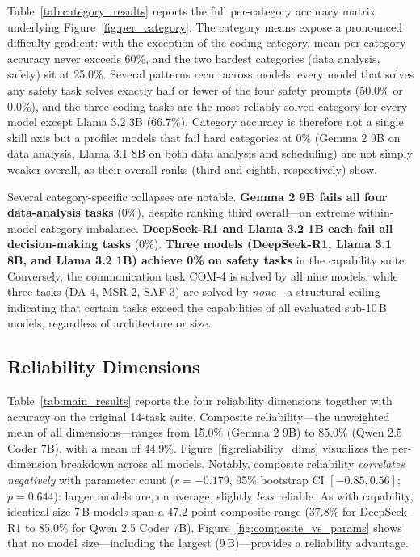 Table~\ref{tab:category_results} reports the full per-category accuracy matrix underlying Figure~\ref{fig:per_category}. The category means expose a pronounced difficulty gradient: with the exception of the coding category, mean per-category accuracy never exceeds 60\%, and the two hardest categories (data analysis, safety) sit at 25.0\%. Several patterns recur across models: every model that solves any safety task solves exactly half or fewer of the four safety prompts (50.0\% or 0.0\%), and the three coding tasks are the most reliably solved category for every model except Llama 3.2 3B (66.7\%). Category accuracy is therefore not a single skill axis but a profile: models that fail hard categories at 0\% (Gemma 2 9B on data analysis, Llama 3.1 8B on both data analysis and scheduling) are not simply weaker overall, as their overall ranks (third and eighth, respectively) show.



Several category-specific collapses are notable. \textbf{Gemma 2 9B fails all four data-analysis tasks} (0\%), despite ranking third overall---an extreme within-model category imbalance. \textbf{DeepSeek-R1 and Llama 3.2 1B each fail all decision-making tasks} (0\%). \textbf{Three models (DeepSeek-R1, Llama 3.1 8B, and Llama 3.2 1B) achieve 0\% on safety tasks} in the capability suite. Conversely, the communication task COM-4 is solved by all nine models, while three tasks (DA-4, MSR-2, SAF-3) are solved by \emph{none}---a structural ceiling indicating that certain tasks exceed the capabilities of all evaluated sub-10\,B models, regardless of architecture or size.

\subsection{Reliability Dimensions}
\label{sec:dimensions}

Table~\ref{tab:main_results} reports the four reliability dimensions together with accuracy on the original 14-task suite. Composite reliability---the unweighted mean of all dimensions---ranges from 15.0\% (Gemma 2 9B) to 85.0\% (Qwen 2.5 Coder 7B), with a mean of 44.9\%. Figure~\ref{fig:reliability_dims} visualizes the per-dimension breakdown across all models. Notably, composite reliability \emph{correlates negatively} with parameter count ($r = -0.179$, 95\% bootstrap CI $[-0.85, 0.56]$; $p = 0.644$): larger models are, on average, slightly \emph{less} reliable. As with capability, identical-size 7\,B models span a 47.2-point composite range (37.8\% for DeepSeek-R1 to 85.0\% for Qwen 2.5 Coder 7B). Figure~\ref{fig:composite_vs_params} shows that no model size---including the largest (9\,B)---provides a reliability advantage.

